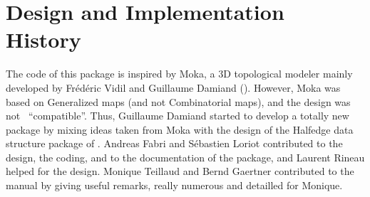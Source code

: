 

%

\section{Design and Implementation History}
%
The code of this package is inspired by Moka, a 3D topological modeler
mainly developed by Fr\'ed\'eric Vidil and Guillaume Damiand
().
However, Moka was based on Generalized maps (and not Combinatorial
maps), and the design was not \cgal\ ``compatible''. Thus, Guillaume
Damiand started to develop a totally new package by mixing ideas taken
from Moka with the design of the Halfedge data structure package of
\cgal.  Andreas Fabri and S\'ebastien Loriot contributed to the
design, the coding, and to the documentation of the package, and
Laurent Rineau helped for the design. Monique Teillaud and Bernd
Gaertner contributed to the manual by giving useful remarks, really
numerous and detailled for Monique.
